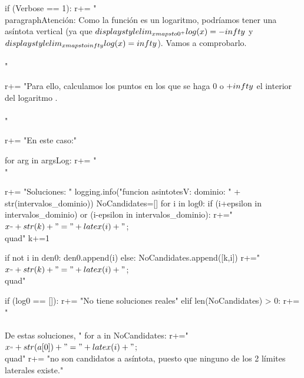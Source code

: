 \begin{sagesilent}
        if (Verbose == 1):
            r+= "\\paragraph{Atención: } Como la función es un logaritmo, podríamos tener una asíntota vertical (ya que $\\displaystyle\\lim_{x\\mapsto 0^+} \\log(x) = -\\infty$ y $\\displaystyle\\lim_{x\\mapsto\\infty}\\log(x) = \\infty$). Vamos a comprobarlo.\\\\"

            r+= "Para ello, calculamos los puntos en los que se haga 0 o $+\\infty$ el interior del logaritmo .\\\\"

        
            r+= "En este caso:"

        for arg in argsLog:
            r+= "\\[ "+latex(arg)+"= 0 \\]"

        r+= "Soluciones: "
        logging.info("funcion asintotesV: dominio: " + str(intervalos_dominio))
        NoCandidates=[]
        for i in log0:
            if (i+epsilon in intervalos_dominio) or (i-epsilon in intervalos_dominio):
                r+="$x_"+str(k)+"="+latex(i)+" $;\\quad"
                k+=1
            
                if not i in den0:
                    den0.append(i)
            else:   
                NoCandidates.append([k,i])
                r+="$x_"+str(k)+"="+latex(i)+" $;\\quad"                
            
        if (log0 == []):
            r+= "No tiene soluciones reales"
        elif len(NoCandidates) > 0:
            r+= "\\\\De estas soluciones, "
            for a in NoCandidates:
                r+="$x_"+str(a[0])+"="+latex(i)+" $;\\quad"                
            r+= "no son candidatos a asíntota, puesto que ninguno de los 2 límites laterales existe."
            



\end{sagesilent}
